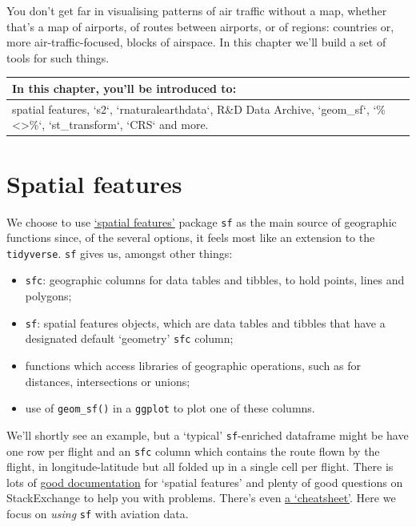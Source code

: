\documentclass[
]{book}
\providecommand{\tightlist}{%
  \setlength{\itemsep}{0pt}\setlength{\parskip}{0pt}}
\begin{document}
You don't get far in visualising patterns of air traffic without a map, whether that's a map of airports, of routes between airports, or of regions: countries or, more air-traffic-focused, blocks of airspace. In this chapter we'll build a set of tools for such things.

\begin{tabular}{l}
\hline
In this chapter, you'll be introduced to:\\
\hline
spatial features, `s2`, `rnaturalearthdata`, R\&D Data Archive, `geom\_sf`, `\%<>\%`, `st\_transform`, `CRS` and more.\\
\hline
\end{tabular}

\hypertarget{spatialFeatures}{%
\section{Spatial features}\label{spatialFeatures}}

We choose to use \href{https://r-spatial.github.io/sf/}{`spatial features'} package \texttt{sf} as the main source of geographic functions since, of the several options, it feels most like an extension to the \texttt{tidyverse}. \texttt{sf} gives us, amongst other things:

\begin{itemize}
\tightlist
\item
  \texttt{sfc}: geographic columns for data tables and tibbles, to hold points, lines and polygons;
\item
  \texttt{sf}: spatial features objects, which are data tables and tibbles that have a designated default `geometry' \texttt{sfc} column;
\item
  functions which access libraries of geographic operations, such as for distances, intersections or unions;
\item
  use of \texttt{geom\_sf()} in a \texttt{ggplot} to plot one of these columns.
\end{itemize}

We'll shortly see an example, but a `typical' \texttt{sf}-enriched dataframe might be have one row per flight and an \texttt{sfc} column which contains the route flown by the flight, in longitude-latitude but all folded up in a single cell per flight. There is lots of \href{https://r-spatial.github.io/sf/}{good documentation} for `spatial features' and plenty of good questions on StackExchange to help you with problems. There's even \href{https://r-spatial.github.io/sf/\#cheatsheet}{a `cheatsheet'}. Here we focus on \emph{using} \texttt{sf} with aviation data.
\end{document}
